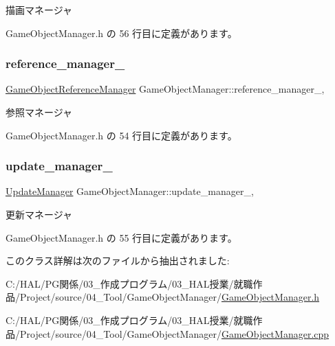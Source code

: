 描画マネージャ 



 Game\+Object\+Manager.\+h の 56 行目に定義があります。

\mbox{\label{class_game_object_manager_a7346dd916f897462898a1b28c03cd466}} 
\subsubsection{\texorpdfstring{reference\+\_\+manager\+\_\+}{reference\_manager\_}}
{\footnotesize\ttfamily \mbox{\hyperlink{class_game_object_reference_manager}{Game\+Object\+Reference\+Manager}} Game\+Object\+Manager\+::reference\+\_\+manager\+\_\+\hspace{0.3cm}{\ttfamily [static]}, {\ttfamily [private]}}



参照マネージャ 



 Game\+Object\+Manager.\+h の 54 行目に定義があります。

\mbox{\label{class_game_object_manager_a330c1759e1a075fb257a01c6f48cf9f3}} 
\subsubsection{\texorpdfstring{update\+\_\+manager\+\_\+}{update\_manager\_}}
{\footnotesize\ttfamily \mbox{\hyperlink{class_update_manager}{Update\+Manager}} Game\+Object\+Manager\+::update\+\_\+manager\+\_\+\hspace{0.3cm}{\ttfamily [static]}, {\ttfamily [private]}}



更新マネージャ 



 Game\+Object\+Manager.\+h の 55 行目に定義があります。



このクラス詳解は次のファイルから抽出されました\+:\begin{DoxyCompactItemize}
\item 
C\+:/\+H\+A\+L/\+P\+G関係/03\+\_\+作成プログラム/03\+\_\+\+H\+A\+L授業/就職作品/\+Project/source/04\+\_\+\+Tool/\+Game\+Object\+Manager/\mbox{\hyperlink{_game_object_manager_8h}{Game\+Object\+Manager.\+h}}\item 
C\+:/\+H\+A\+L/\+P\+G関係/03\+\_\+作成プログラム/03\+\_\+\+H\+A\+L授業/就職作品/\+Project/source/04\+\_\+\+Tool/\+Game\+Object\+Manager/\mbox{\hyperlink{_game_object_manager_8cpp}{Game\+Object\+Manager.\+cpp}}\end{DoxyCompactItemize}
